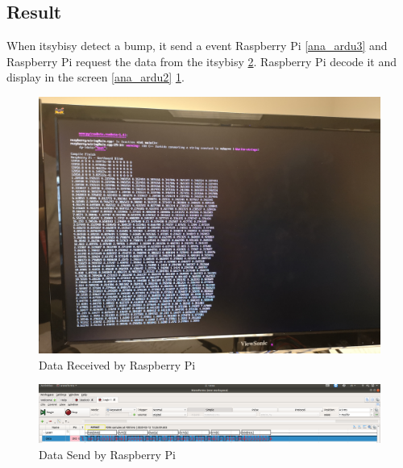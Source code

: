 \documentclass{article}
\begin{document}
	\subsection{Result}
	When itsybisy detect a bump, it send a event Raspberry Pi \ref{ana_ardu3} and Raspberry Pi request the data from the itsybisy \ref{rbp_data3}. Raspberry Pi decode it and display in the screen \ref{ana_ardu2} \ref{rbp_data2}.
	\begin{figure}[hb]
		\includegraphics[width=\textwidth]{img/Lab2_Arduino-rbp_1.jpg}
		\caption{Data Received by Raspberry Pi} 
		\label{rbp_data2}
	\end{figure}

	\begin{figure}[hb]
		\includegraphics[width=\textwidth]{img/Lab2_RBP_Data.png}
		\caption{Data Send by Raspberry Pi} 
		\label{rbp_data3}
	\end{figure}
\end{document}
